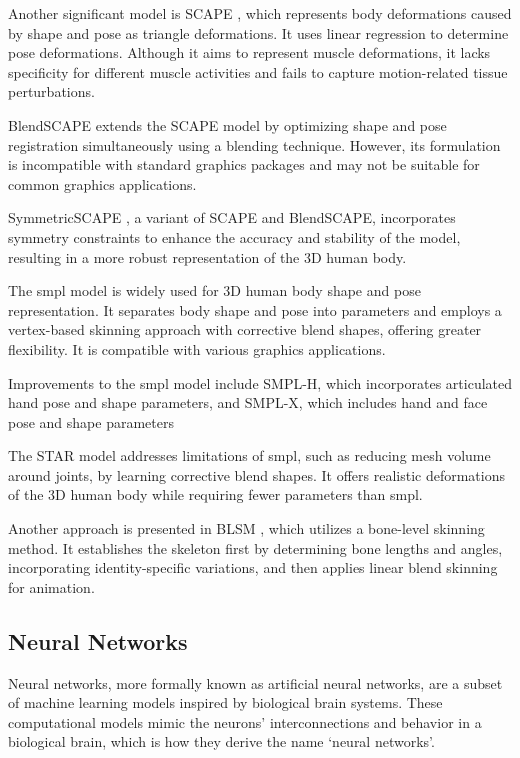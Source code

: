 Another significant model is SCAPE \citep{scape}, which represents body
deformations caused by shape and pose as triangle deformations. It uses linear
regression to determine pose deformations. Although it aims to represent muscle
deformations, it lacks specificity for different muscle activities and fails to
capture motion-related tissue perturbations.

BlendSCAPE \citep{blendscape} extends the SCAPE model by optimizing shape and
pose registration simultaneously using a blending technique. However, its
formulation is incompatible with standard graphics packages and may not be
suitable for common graphics applications.

SymmetricSCAPE \citep{CHEN201952}, a variant of SCAPE and BlendSCAPE,
incorporates symmetry constraints to enhance the accuracy and stability of the
model, resulting in a more robust representation of the 3D human body.

The \gls{smpl} \citep{SMPL:2015} model is widely used for 3D human body shape
and pose representation. It separates body shape and pose into parameters and
employs a vertex-based skinning approach with corrective blend shapes, offering
greater flexibility. It is compatible with various graphics applications.

Improvements to the \gls{smpl} model include SMPL-H, which incorporates
articulated hand pose and shape parameters, and SMPL-X, which includes hand and
face pose and shape parameters \citep{SMPL-X:2019}

The STAR model \citep{STAR:2020} addresses limitations of \gls{smpl}, such as
reducing mesh volume around joints, by learning corrective blend shapes. It
offers realistic deformations of the 3D human body while requiring fewer
parameters than \gls{smpl}.

Another approach is presented in BLSM \citep{doi:10.1007/978-3-030-58558-7_1},
which utilizes a bone-level skinning method. It establishes the skeleton first
by determining bone lengths and angles, incorporating identity-specific
variations, and then applies linear blend skinning for animation.

\subsection{Neural Networks}

Neural networks, more formally known as artificial neural networks, are a
subset of machine learning models inspired by biological brain systems. These
computational models mimic the neurons' interconnections and behavior in a
biological brain, which is how they derive the name `neural networks'.

